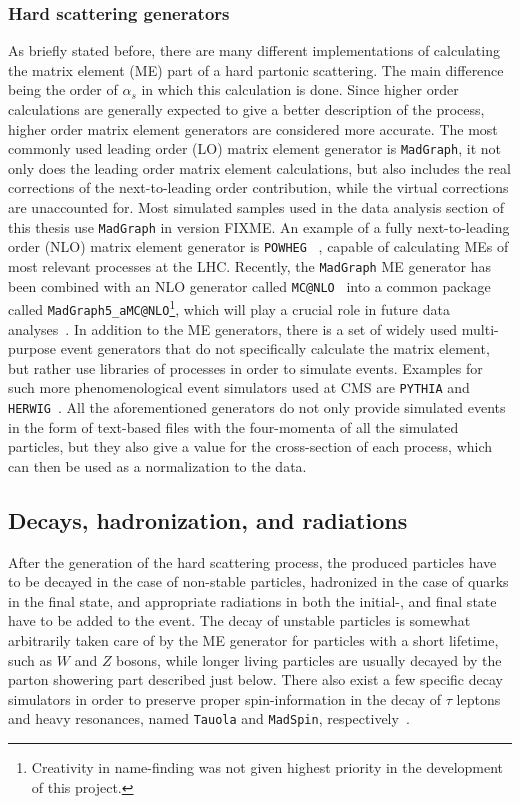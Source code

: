 \subsubsection*{Hard scattering generators}
As briefly stated before, there are many different implementations of calculating the matrix element (ME) part of a hard partonic scattering. The main difference being the order of
$\alpha_s$ in which this calculation is done. Since higher order calculations are generally expected to give a better description of the process, higher order matrix element
generators are considered more accurate. The most commonly used leading order (LO) matrix element generator is \texttt{MadGraph}\cite{madgraph}, it not only does the leading order
matrix element calculations, but also includes the real corrections of the next-to-leading order contribution, while the virtual corrections are unaccounted for. Most simulated
samples used in the data analysis section of this thesis use \texttt{MadGraph} in version FIXME. An example of a fully next-to-leading order (NLO) matrix element generator is 
\texttt{POWHEG} ~\cite{powheg}, capable of calculating MEs of most relevant processes at the LHC. Recently, the \texttt{MadGraph} ME generator has been combined with an NLO 
generator called \texttt{MC@NLO}~\cite{mcatnlo} into a common package called \texttt{MadGraph5\_aMC@NLO}\footnote{Creativity in name-finding was not given highest priority in the development
of this project.}, which will play a crucial role in future data analyses~\cite{madgraphamcatnlo}. In addition to the ME generators, there is a set of widely used multi-purpose event
generators that do not specifically calculate the matrix element, but rather use libraries of processes in order to simulate events. Examples for such more phenomenological event simulators
used at CMS are \texttt{PYTHIA} and \texttt{HERWIG}~\cite{pythia6,herwig}. 
All the aforementioned generators do not only provide simulated events in the form of text-based files with the four-momenta of all the simulated particles, but they also give a
value for the cross-section of each process, which can then be used as a normalization to the data.

\subsection{Decays, hadronization, and radiations}
\label{sub:hadr}
After the generation of the hard scattering process, the produced particles have to be decayed in the case of non-stable particles, hadronized in the case of quarks in the final state, 
and appropriate radiations in both the initial-, and final state have to be added to the event. The decay of unstable particles is somewhat arbitrarily taken care of by the ME generator
for particles with a short lifetime, such as $W$ and $Z$ bosons, while longer living particles are usually decayed by the parton showering part described just below. There also exist a
few specific decay simulators in order to preserve proper spin-information in the decay of $\tau$ leptons and heavy resonances, named \texttt{Tauola} and \texttt{MadSpin}, 
respectively~\cite{tauola,madspin}.

